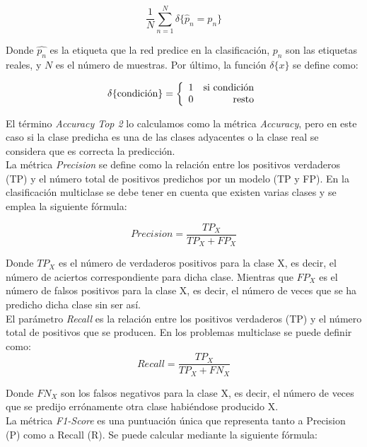 $$\frac{1}{N} \sum\limits_{n=1}^N \delta\{ \hat{p}_n = p_n \}$$
\vspace{10pt}

Donde $\hat{p_n}$ es la etiqueta que la red predice en la clasificación, $p_n$ son las etiquetas reales, y $N$ es el número de muestras. Por último, la función $\delta\{x\}$ se define como:

$$\delta\{ \textup{condición}\} = \left\{ \begin{array}{lr} 1 &  \textup{si condición} \\ 0 & \mbox{resto} \end{array} \right.$$
\vspace{10pt}

El término \textit{Accuracy Top 2} lo calculamos como la métrica \textit{Accuracy}, pero en este caso si la clase predicha es una de las clases adyacentes o la clase real se considera que es correcta la predicción.\\

La métrica \textit{Precision} se define como la relación entre los positivos verdaderos (TP) y el número total de positivos predichos por un modelo (TP y FP). En la clasificación multiclase se debe tener en cuenta que existen varias clases y se emplea la siguiente fórmula:

 
\[ Precision = \frac{TP_X}{TP_X + FP_X} \]
\vspace{10pt}

Donde \(TP_X\) es el número de verdaderos positivos para la clase X, es decir, el número de aciertos correspondiente para dicha clase. Mientras que \(FP_X\) es el número de falsos positivos para la clase X, es decir, el número de veces que se ha predicho dicha clase sin ser así.\\


El parámetro \textit{Recall} es la relación entre los positivos verdaderos (TP) y el número total de positivos que se producen. En los problemas multiclase se puede definir como:\\

\[ Recall = \frac{TP_X}{TP_X + FN_X} \]
\vspace{10pt}

Donde \(FN_X\) son los falsos negativos para la clase X, es decir, el número de veces que se predijo
errónamente otra clase habiéndose producido X.\\

La métrica \textit{F1-Score} es una puntuación única que representa tanto a Precision (P) como a Recall (R). Se puede calcular mediante la siguiente fórmula:

